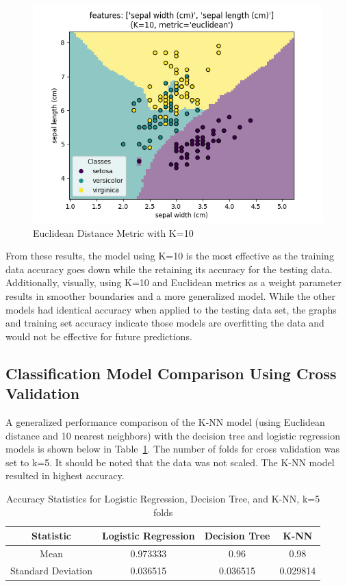 \documentclass[journal]{IEEEtran}
\begin{document}
\begin{figure}[h!]
\includegraphics[scale=0.5]{euclidean_k10.png}
\centering
\caption{Euclidean Distance Metric with K=10}
\label{fig:euclk10}
\end{figure}

From these results, the model using K=10 is the most effective as the training data accuracy goes down while the retaining its accuracy for the testing data. Additionally, visually, using K=10 and Euclidean metrics as a weight parameter results in smoother boundaries and a more generalized model. While the other models had identical accuracy when applied to the testing data set, the graphs and training set accuracy indicate those models are overfitting the data and would not be effective for future predictions. 

\subsection{Classification Model Comparison Using Cross Validation}
A generalized performance comparison of the K-NN model (using Euclidean distance and 10 nearest neighbors) with the decision tree and logistic regression models is shown below in Table~\ref{table:stats3models}. The number of folds for cross validation was set to k=5. It should be noted that the data was not scaled. The K-NN model resulted in highest accuracy.  

\begin{table}[h!]
\centering
\begin{tabular}{ c | c c c }
Statistic & Logistic Regression & Decision Tree & K-NN \\
\hline
Mean & 0.973333 & 0.96 & 0.98 \\
Standard Deviation & 0.036515 & 0.036515 & 0.029814 \\
\end{tabular}
\caption{Accuracy Statistics for Logistic Regression, Decision Tree, and K-NN, k=5 folds}
\label{table:stats3models}
\end{table}
\end{document}
